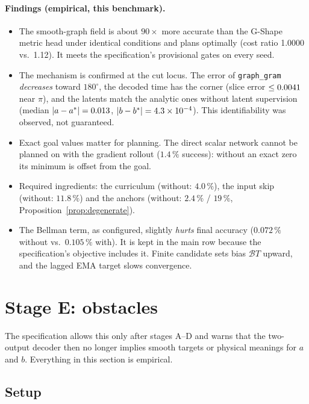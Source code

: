 \documentclass[11pt]{article}
\newcommand{\code}[1]{\texttt{#1}}
\newcommand{\pct}{\,\%}
\begin{document}
\paragraph{Findings (empirical, this benchmark).}
\begin{itemize}
\item The smooth-graph field is about $90\times$ more accurate than the G-Shape metric head under
identical conditions and plans optimally (cost ratio 1.0000 vs.\ 1.12). It meets the specification's
provisional gates on every seed.
\item The mechanism is confirmed at the cut locus. The error of \code{graph\_gram}
\emph{decreases} toward $180^\circ$, the decoded time has the corner (slice error
$\le0.0041$ near $\pi$), and the latents match the analytic ones without latent supervision
(median $|a-a^*|=0.013$, $|b-b^*|=4.3\times10^{-4}$). This identifiability was observed, not
guaranteed.
\item Exact goal values matter for planning. The direct scalar network cannot be planned on with
the gradient rollout ($1.4\pct$ success): without an exact zero its minimum is offset from the goal.
\item Required ingredients: the curriculum (without: $4.0\pct$), the input skip (without:
$11.8\pct$) and the anchors (without: $2.4\pct$ / $19\pct$, Proposition~\ref{prop:degenerate}).
\item The Bellman term, as configured, slightly \emph{hurts} final accuracy ($0.072\pct$ without vs.\
$0.105\pct$ with). It is kept in the main row because the specification's objective includes it.
Finite candidate sets bias $\mathcal BT$ upward, and the lagged EMA target slows convergence.
\end{itemize}

\section{Stage E: obstacles}
\label{sec:stagee}

The specification allows this only after stages A--D and warns that the two-output decoder then no
longer implies smooth targets or physical meanings for $a$ and $b$. Everything in this section is
empirical.

\subsection{Setup}
\end{document}
